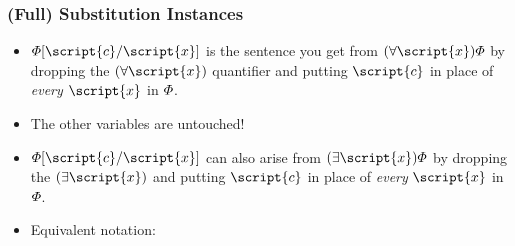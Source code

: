 \begin{frame}
\frametitle{(Full) Substitution Instances}

\begin{itemize}[<+->]

\item $\metaA{}\substitute{\script{x}}{\script{c}}$ is the sentence you get from $\qt{\forall}{\script{x}}\metaA{}$ by dropping the $\qt{\forall}{\script{x}}$ quantifier and putting $\script{c}$ in place of \emph{every} $\script{x}$ in $\varPhi{}$. 

\item The other variables are untouched! 

\item $\metaA{}\substitute{\script{x}}{\script{c}}$ can also arise from $\qt{\exists}{\script{x}}\metaA{}$ by dropping the $\qt{\exists}{\script{x}}$ and putting $\script{c}$ in place of \emph{every} $\script{x}$ in $\varPhi{}$. 

\item Equivalent notation: \metaA{}\hspace{.15em}

\end{itemize}
\end{frame}

